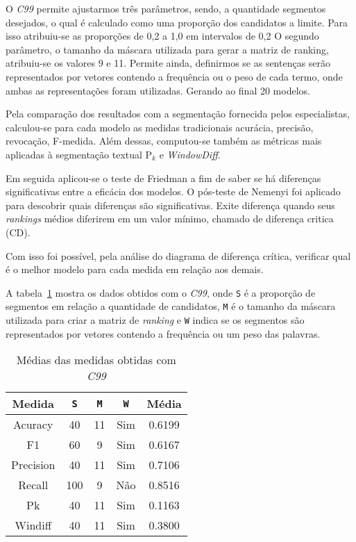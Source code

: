 O \textit{C99} permite ajustarmos três parâmetros, sendo, a quantidade segmentos desejados, o qual é calculado como uma proporção dos candidatos a limite. Para isso atribuiu-se as proporções de 0,2 a 1,0 em intervalos de 0,2 O segundo parâmetro, o tamanho da máscara utilizada para gerar a matriz de ranking, atribuiu-se os valores 9 e 11. Permite ainda, definirmos se as sentenças serão representados por vetores contendo a frequência ou o peso de cada termo, onde ambas as representações foram utilizadas. Gerando ao final 20 modelos.



Pela comparação dos resultados com a segmentação fornecida pelos especialistas, calculou-se para cada modelo as medidas tradicionais acurácia, precisão, revocação, F-medida. Além dessas, computou-se também as métricas mais aplicadas à segmentação textual P$_k$ e \textit{WindowDiff}.



Em seguida aplicou-se o teste de Friedman a fim de saber se há diferenças significativas entre a eficácia dos modelos. O pós-teste de Nemenyi foi aplicado para descobrir quais diferenças são significativas. 
%
Exite diferença quando seus \textit{rankings} médios diferirem em um valor mínimo, chamado de diferença critica (CD). 
%

Com isso foi possível, pela análise do diagrama de diferença crítica, verificar qual é o melhor modelo para cada medida
em relação aos demais. 


A tabela~\ref{tab:mediasC99} mostra os dados obtidos com o \textit{C99}, onde \texttt{S} é a proporção de segmentos em relação a quantidade de candidatos, \texttt{M} é o tamanho da máscara utilizada para criar a matriz de \textit{ranking} e \texttt{W} indica se os segmentos são representados por vetores contendo a frequência ou um peso das palavras. 



\begin{table}[!h]
	\centering

	\begin{tabular}{|c|c|c|c|c|}
	
		\hline
		Medida & \texttt{S} & \texttt{M} & \texttt{W} & \textbf{Média}\\		
		\hline

		Acuracy		& 40	& 11 & Sim & 0.6199	\\ \hline	
		F1			& 60	& 9	 & Sim & 0.6167	\\ \hline	
		Precision	& 40	& 11 & Sim & 0.7106	\\ \hline			
		Recall		& 100	& 9	 & Não & 0.8516	\\ \hline		
		Pk			& 40	& 11 & Sim & 0.1163	\\ \hline	
		Windiff		& 40	& 11 & Sim & 0.3800	\\ \hline		

		
	\end{tabular}
	
	\caption{Médias das medidas obtidas com \textit{C99}}
	\label{tab:mediasC99}
\end{table}


